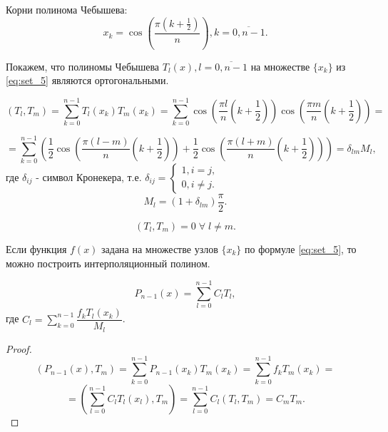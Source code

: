 Корни полинома Чебышева:
\begin{equation}\label{eq:set_5}
  x_k = \cos \left( \dfrac{\pi \left(k + \frac{1}{2}\right)}{n} \right), k = \overline{0, n - 1}.
\end{equation}

Покажем, что полиномы Чебышева $T_l (x), l = \overline{0, n - 1}$ на множестве $\{ x_k \}$ из \eqref{eq:set_5} являются ортогональными.

\begin{equation*}
  \left( T_l, T_m \right) = \sum\limits_{k = 0}^{n-1} T_l (x_k) T_m (x_k) = \sum\limits_{k = 0}^{n-1} \cos \left( \dfrac{\pi l}{n} \left(k + \frac{1}{2}\right) \right) \cos \left( \dfrac{\pi m}{n} \left(k + \frac{1}{2}\right) \right) =
\end{equation*}

\begin{equation*}
  = \sum\limits_{k = 0}^{n-1} \left( \dfrac{1}{2} \cos\left( \dfrac{\pi (l - m)}{n} \left(k + \frac{1}{2}\right) \right)
  + \dfrac{1}{2} \cos\left( \dfrac{\pi (l + m)}{n} \left(k + \frac{1}{2}\right) \right)  \right) = \delta_{lm} M_l,
\end{equation*}
где $\delta_{ij}$ - символ Кронекера, т.е. $ \delta_{ij} = \begin{cases} 1, i = j, \\ 0, i \ne j. \end{cases}$
\begin{equation*}
  M_l = (1 + \delta_{lm}) \dfrac{\pi}{2}.
\end{equation*}

\begin{equation*}
  (T_l, T_m) = 0 \; \forall \; l \ne m.
\end{equation*}

Если функция $f(x)$ задана на множестве узлов $\{ x_k \}$ по формуле \eqref{eq:set_5}, то можно построить интерполяционный полином.

\begin{equation}\label{eq:cheb_8}
  P_{n-1}(x) = \sum\limits_{l = 0}^{n-1} C_l T_l,
\end{equation}
где $C_l = \sum\limits_{k = 0}^{n-1} \dfrac{f_k T_l (x_k)}{M_l}$.

\begin{proof}
  \begin{equation*}
    \left( P_{n-1}(x), T_m \right) = \sum\limits_{k = 0}^{n-1} P_{n-1}(x_k) T_m (x_k) = \sum\limits_{k = 0}^{n-1} f_k T_m(x_k) =
  \end{equation*}
  \begin{equation*}
    = \left( \sum\limits_{l = 0}^{n-1} C_l T_l (x_l), T_m \right) = \sum\limits_{l = 0}^{n-1} C_l (T_l, T_m) = C_m T_m.
  \end{equation*}
\end{proof}

